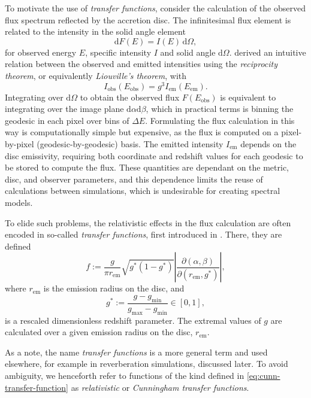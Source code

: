 \documentclass[fleqn,usenatbib]{mnras}
\renewcommand{\d}{\text{d}}
\newcommand{\jacobian}[2]{\left\lvert \frac{\partial #1}{\partial #2} \right\rvert}
\begin{document}
To motivate the use of \emph{transfer functions}, consider the calculation of
the observed flux spectrum reflected by the accretion disc.  The infinitesimal
flux element is related to the intensity in the solid angle element
\begin{equation}
\label{eq:infinitesimal-flux}
\d F(E) = I(E)\, \d \Omega,
\end{equation}
for observed energy $E$, specific intensity $I$ and solid angle $\d \Omega$.
\cite{ingram_public_2019} derived an intuitive relation between the observed
and emitted intensities using the \emph{reciprocity theorem}, or
equivalently \emph{Liouville's theorem}, with
\begin{equation}
\label{eq:liouville-theorem}
I_\text{obs}\left( E_\text{obs}\right) = g^3 I_\text{em}\left(E_\text{em}\right).
\end{equation}
Integrating over $\d \Omega$ to obtain the observed flux $F(E_\text{obs})$ is
equivalent to integrating over the image plane $\d \alpha \d \beta$, which in
practical terms is binning the geodesic in each pixel over bins of $\Delta E$.
Formulating the flux calculation in this way is computationally simple but
expensive, as the flux is computed on a pixel-by-pixel (geodesic-by-geodesic)
basis. The emitted intensity $I_\text{em}$ depends on the disc emissivity, requiring both
coordinate and redshift values for each geodesic to be stored to compute the
flux. These quantities are dependant on the metric, disc, and observer
parameters, and this dependence limits the reuse of calculations between
simulations, which is undesirable for creating spectral models.

To elide such problems, the relativistic effects in the flux calculation are
often encoded in so-called \emph{transfer functions}, first introduced in
\cite{cunningham_effects_1975}. There, they are defined
\begin{equation}
    \label{eq:cunn-transfer-function}
    f:=\frac{g}{\pi r_\text{em}} \sqrt{g^\ast(1 - g^\ast)} \jacobian{(\alpha, \beta)}{(r_\text{em}, g^\ast)},
\end{equation}
where $r_\text{em}$ is the emission radius on the disc, and
\begin{equation}
    g^\ast := \frac{g - g_\text{min}}{g_\text{max} - g_\text{min}} \in [0, 1],
\end{equation}
is a rescaled dimensionless redshift parameter. The extremal values of $g$ are
calculated over a given emission radius on the disc, $r_\text{em}$.

As a note, the name \emph{transfer functions} is a more general term and used
elsewhere, for example in reverberation simulations, discussed later.  To avoid
ambiguity, we henceforth refer to functions of the kind defined in
\eqref{eq:cunn-transfer-function} as \emph{relativistic} or \emph{Cunningham
transfer functions}.
\end{document}
